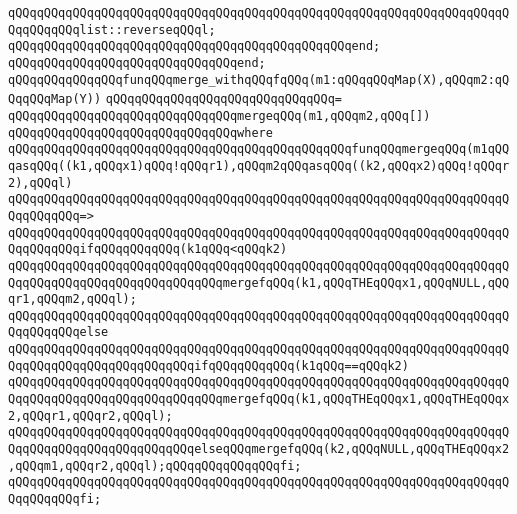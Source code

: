 \verb|qQQqqQQqqQQqqQQqqQQqqQQqqQQqqQQqqQQqqQQqqQQqqQQqqQQqqQQqqQQqqQQqqQQqqQQqqQQqqQQqlist::reverseqQQql;|\newline
\verb|qQQqqQQqqQQqqQQqqQQqqQQqqQQqqQQqqQQqqQQqqQQqqQQqend;|\newline
\verb|qQQqqQQqqQQqqQQqqQQqqQQqqQQqqQQqend;|\newline
\newline
\verb|qQQqqQQqqQQqqQQqfunqQQqmerge_withqQQqfqQQq(m1:qQQqqQQqMap(X),qQQqm2:qQQqqQQqMap(Y))|\newline
\verb|qQQqqQQqqQQqqQQqqQQqqQQqqQQqqQQq=|\newline
\verb|qQQqqQQqqQQqqQQqqQQqqQQqqQQqqQQqmergeqQQq(m1,qQQqm2,qQQq[])|\newline
\verb|qQQqqQQqqQQqqQQqqQQqqQQqqQQqqQQqwhere|\newline
\newline
\verb|qQQqqQQqqQQqqQQqqQQqqQQqqQQqqQQqqQQqqQQqqQQqqQQqfunqQQqmergeqQQq(m1qQQqasqQQq((k1,qQQqx1)qQQq!qQQqr1),qQQqm2qQQqasqQQq((k2,qQQqx2)qQQq!qQQqr2),qQQql)|\newline
\verb|qQQqqQQqqQQqqQQqqQQqqQQqqQQqqQQqqQQqqQQqqQQqqQQqqQQqqQQqqQQqqQQqqQQqqQQqqQQqqQQq=>|\newline
\verb|qQQqqQQqqQQqqQQqqQQqqQQqqQQqqQQqqQQqqQQqqQQqqQQqqQQqqQQqqQQqqQQqqQQqqQQqqQQqqQQqifqQQqqQQqqQQq(k1qQQq<qQQqk2)|\newline
\newline
\verb|qQQqqQQqqQQqqQQqqQQqqQQqqQQqqQQqqQQqqQQqqQQqqQQqqQQqqQQqqQQqqQQqqQQqqQQqqQQqqQQqqQQqqQQqqQQqqQQqqQQqmergefqQQq(k1,qQQqTHEqQQqx1,qQQqNULL,qQQqr1,qQQqm2,qQQql);|\newline
\verb|qQQqqQQqqQQqqQQqqQQqqQQqqQQqqQQqqQQqqQQqqQQqqQQqqQQqqQQqqQQqqQQqqQQqqQQqqQQqqQQqelse|\newline
\verb|qQQqqQQqqQQqqQQqqQQqqQQqqQQqqQQqqQQqqQQqqQQqqQQqqQQqqQQqqQQqqQQqqQQqqQQqqQQqqQQqqQQqqQQqqQQqqQQqifqQQqqQQqqQQq(k1qQQq==qQQqk2)|\newline
\verb|qQQqqQQqqQQqqQQqqQQqqQQqqQQqqQQqqQQqqQQqqQQqqQQqqQQqqQQqqQQqqQQqqQQqqQQqqQQqqQQqqQQqqQQqqQQqqQQqqQQqmergefqQQq(k1,qQQqTHEqQQqx1,qQQqTHEqQQqx2,qQQqr1,qQQqr2,qQQql);|\newline
\verb|qQQqqQQqqQQqqQQqqQQqqQQqqQQqqQQqqQQqqQQqqQQqqQQqqQQqqQQqqQQqqQQqqQQqqQQqqQQqqQQqqQQqqQQqqQQqqQQqelseqQQqmergefqQQq(k2,qQQqNULL,qQQqTHEqQQqx2,qQQqm1,qQQqr2,qQQql);qQQqqQQqqQQqqQQqfi;|\newline
\verb|qQQqqQQqqQQqqQQqqQQqqQQqqQQqqQQqqQQqqQQqqQQqqQQqqQQqqQQqqQQqqQQqqQQqqQQqqQQqqQQqfi;|\newline
\newline
